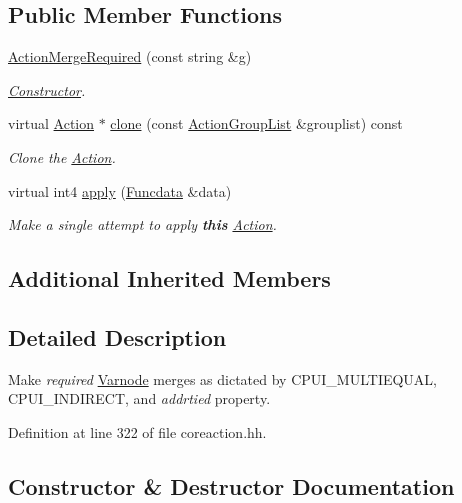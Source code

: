 \subsection*{Public Member Functions}
\begin{DoxyCompactItemize}
\item 
\mbox{\hyperlink{class_action_merge_required_a7b06ab4857cfa0d3780e781312d6817a}{Action\+Merge\+Required}} (const string \&g)
\begin{DoxyCompactList}\small\item\em \mbox{\hyperlink{class_constructor}{Constructor}}. \end{DoxyCompactList}\item 
virtual \mbox{\hyperlink{class_action}{Action}} $\ast$ \mbox{\hyperlink{class_action_merge_required_ab7fa4212557a6a7d32f4f2eab26e08e9}{clone}} (const \mbox{\hyperlink{class_action_group_list}{Action\+Group\+List}} \&grouplist) const
\begin{DoxyCompactList}\small\item\em Clone the \mbox{\hyperlink{class_action}{Action}}. \end{DoxyCompactList}\item 
virtual int4 \mbox{\hyperlink{class_action_merge_required_a2cee2e5fc759fbf5ba680f08bfb4d0e3}{apply}} (\mbox{\hyperlink{class_funcdata}{Funcdata}} \&data)
\begin{DoxyCompactList}\small\item\em Make a single attempt to apply {\bfseries{this}} \mbox{\hyperlink{class_action}{Action}}. \end{DoxyCompactList}\end{DoxyCompactItemize}
\subsection*{Additional Inherited Members}


\subsection{Detailed Description}
Make {\itshape required} \mbox{\hyperlink{class_varnode}{Varnode}} merges as dictated by C\+P\+U\+I\+\_\+\+M\+U\+L\+T\+I\+E\+Q\+U\+AL, C\+P\+U\+I\+\_\+\+I\+N\+D\+I\+R\+E\+CT, and {\itshape addrtied} property. 

Definition at line 322 of file coreaction.\+hh.



\subsection{Constructor \& Destructor Documentation}
\mbox{\label{class_action_merge_required_a7b06ab4857cfa0d3780e781312d6817a}} 
